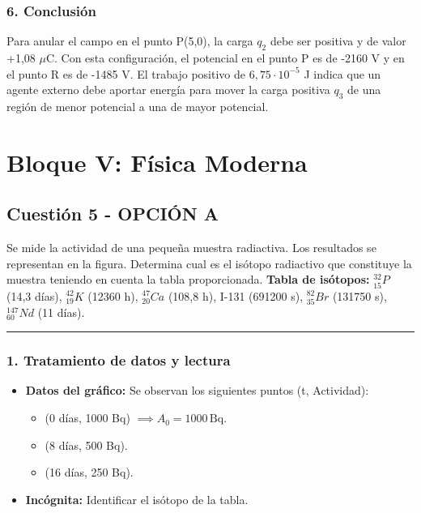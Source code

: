 \subsubsection*{6. Conclusión}
\begin{cajaconclusion}
Para anular el campo en el punto P(5,0), la carga $q_2$ debe ser positiva y de valor +1,08 $\mu$C. Con esta configuración, el potencial en el punto P es de -2160 V y en el punto R es de -1485 V. El trabajo positivo de $6,75 \cdot 10^{-5}$ J indica que un agente externo debe aportar energía para mover la carga positiva $q_3$ de una región de menor potencial a una de mayor potencial.
\end{cajaconclusion}

\newpage

\section{Bloque V: Física Moderna}
\label{sec:moderna_2015_jul_ext}

\subsection{Cuestión 5 - OPCIÓN A}
\label{subsec:5A_2015_jul_ext}

\begin{cajaenunciado}
Se mide la actividad de una pequeña muestra radiactiva. Los resultados se representan en la figura. Determina cual es el isótopo radiactivo que constituye la muestra teniendo en cuenta la tabla proporcionada.
\textbf{Tabla de isótopos:} ${}_{15}^{32}P$ (14,3 días), ${}_{19}^{42}K$ (12360 h), ${}_{20}^{47}Ca$ (108,8 h), I-131 (691200 s), ${}_{35}^{82}Br$ (131750 s), ${}_{60}^{147}Nd$ (11 días).
\end{cajaenunciado}
\hrule

\subsubsection*{1. Tratamiento de datos y lectura}
\begin{itemize}
    \item \textbf{Datos del gráfico:} Se observan los siguientes puntos (t, Actividad):
        \begin{itemize}
            \item (0 días, 1000 Bq) $\implies A_0 = 1000 \, \text{Bq}$.
            \item (8 días, 500 Bq).
            \item (16 días, 250 Bq).
        \end{itemize}
    \item \textbf{Incógnita:} Identificar el isótopo de la tabla.
\end{itemize}

